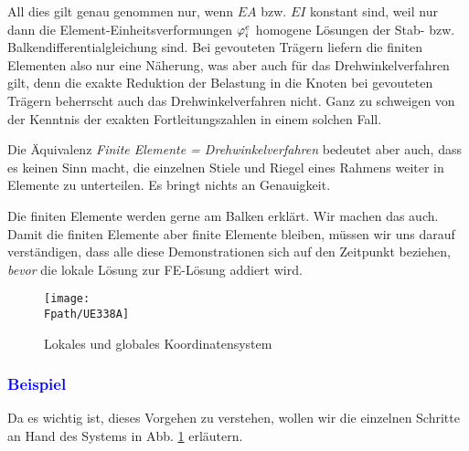 
All dies gilt genau genommen nur, wenn $EA$ bzw. $EI$ konstant sind, weil nur dann die Element-Einheitsverformungen $\varphi_i^e$ homogene L\"{o}sungen der Stab- bzw. Balkendifferentialgleichung sind. Bei gevouteten Tr\"{a}gern liefern die finiten Elementen  also nur eine N\"{a}herung, was aber auch f\"{u}r das Drehwinkelverfahren gilt, denn die exakte Reduktion der Belastung in die Knoten bei gevouteten Tr\"{a}gern beherrscht auch das Drehwinkelverfahren nicht. Ganz zu schweigen von der Kenntnis der exakten Fortleitungszahlen in einem solchen Fall.

Die \"{A}quivalenz {\em Finite Elemente = Drehwinkelverfahren\/} bedeutet aber auch, dass es keinen Sinn macht, die einzelnen Stiele und Riegel eines Rahmens weiter in Elemente zu unterteilen. Es bringt nichts an Genauigkeit.


\begin{remark}
Die finiten Elemente werden gerne am Balken erkl\"{a}rt. Wir machen das auch. Damit die finiten Elemente aber finite Elemente bleiben, m\"{u}ssen wir uns darauf verst\"{a}ndigen, dass alle diese Demonstrationen sich auf den Zeitpunkt beziehen, {\em bevor\/} die lokale L\"{o}sung zur FE-L\"{o}sung addiert wird.
\end{remark}
\begin{figure}[tbp]
\centering
\if {} \sidecaption \fi
\texttt{[image: \\Fpath/UE338A]}
\caption{Lokales und globales Koordinatensystem} \label{UE338}
\end{figure}%
\vspace{-1cm}
{\textcolor{blue}{\subsubsection*{Beispiel}}}
Da es wichtig ist, dieses Vorgehen zu verstehen, wollen wir die einzelnen Schritte an Hand des Systems in Abb.  \ref{UE338} erl\"{a}utern.


